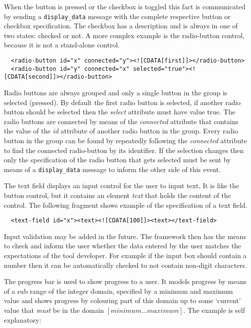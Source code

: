 \documentclass{article}
\newcommand{\msg}[1]{\texttt{#1}}
\begin{document}
    \noindent When the button is pressed or the checkbox is toggled this fact is
    communicated by sending a \msg{display\_data} message with the complete
    respective button or checkbox specification. The checkbox has a description
    and is always in one of two states: checked or not. A more complex example
    is the radio-button control, because it is not a stand-alone control.

    \small \begin{verbatim}
  <radio-button id="x" connected="y"><![CDATA[first]]></radio-button>
  <radio-button id="y" connected="x" selected="true"><![CDATA[second]]></radio-button>\end{verbatim}
  \normalsize

   \noindent Radio buttons are always grouped and only a single button in the
   group is selected (pressed).  By default the first radio button is selected,
   if another radio button should be selected then the \textit{select}
   attribute must have value true. The radio buttons are connected by means of
   the \textit{connected} attribute that contains the value of the \textit{id}
   attribute of another radio button in the group. Every radio button in the
   group can be found by repeatedly following the \textit{connected} attribute
   to find the connected radio-button by its identifier. If the selection
   changes then only the specification of the radio button that gets selected
   must be sent by means of a \msg{display\_data} message to inform the other
   side of this event.

   The text field displays an input control for the user to input text. It is
   like the button control, but it contains an element \textit{text} that
   holds the content of the control. The following fragment shows example of
   the specification of a text field.
   
   \small \begin{verbatim}
  <text-field id="x"><text><![CDATA[100]]><text></text-field>\end{verbatim}
  \normalsize

   Input validation may be added in the future. The framework then has the means
   to check and inform the user whether the data entered by the user matches
   the expectations of the tool developer.  For example if the input box should
   contain a number then it can be automatically checked to not contain
   non-digit characters.

   The progress bar is used to show progress to a user. It models progress by
   means of a sub range of the integer domain, specified by a minimum and
   maximum value and shows progress by colouring part of this domain up to some
   `current' value that \emph{must} be in the domain $[ minimum \ldots
   maximum ]$. The example is self explanatory:
\end{document}
